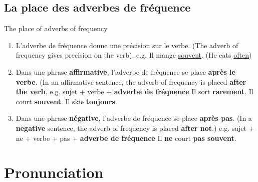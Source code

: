\documentclass[10pt,a4paper,twoside]{article} %
\begin{document}
\subsection*{La place des adverbes de fréquence}
\begin{center}
    The place of adverbs of frequency
\end{center}
\begin{enumerate}
    \item L'adverbe de fréquence donne une précision sur le verbe. (The adverb of frequency gives precision on the verb). \newline
    e.g. Il mange \underline{souvent}. (He eats \underline{often})
    \item Dans une phrase \textbf{affirmative}, l'adverbe de fréquence se place \textbf{après le verbe}. (In an affirmative sentence, the adverb of frequency is placed \textbf{after the verb}. \newline
    e.g. sujet + verbe + \textbf{adverbe de fréquence} \newline
    Il sort \textbf{rarement}. Il court \textbf{souvent}. Il skie \textbf{toujours}.
    \item Dans une phrase \textbf{négative}, l'adverbe de fréquence se place \textbf{après pas}. (In a \textbf{negative} sentence, the adverb of frequency is placed \textbf{after not}.) \newline
    e.g. sujet + ne + verbe + pas + \textbf{adverbe de fréquence} \newline
    Il \textbf{ne} court \textbf{pas souvent}.
\end{enumerate}

\section*{Pronunciation}
\end{document}
